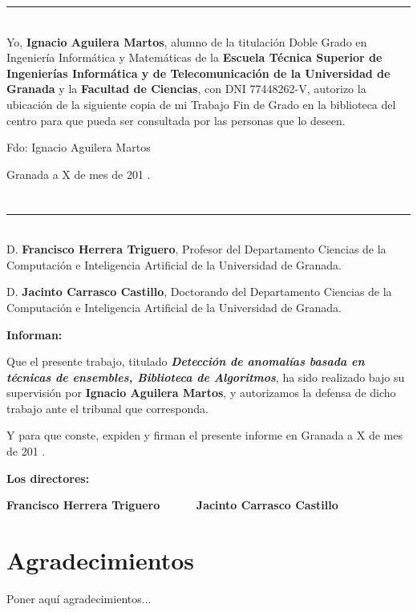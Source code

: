\noindent\rule[-1ex]{\textwidth}{2pt}\\[4.5ex]

Yo, \textbf{Ignacio Aguilera Martos}, alumno de la titulación Doble Grado en Ingeniería Informática y Matemáticas de la \textbf{Escuela Técnica Superior
de Ingenierías Informática y de Telecomunicación de la Universidad de Granada} y la \textbf{Facultad de Ciencias}, con DNI 77448262-V, autorizo la ubicación de la siguiente copia de mi Trabajo Fin de Grado en la biblioteca del centro para que pueda ser consultada por las personas que lo deseen.

\vspace{6cm}

\noindent Fdo: Ignacio Aguilera Martos

\vspace{2cm}

\begin{flushright}
Granada a X de mes de 201 .
\end{flushright}


\chapter*{}
\thispagestyle{empty}

\noindent\rule[-1ex]{\textwidth}{2pt}\\[4.5ex]

D. \textbf{Francisco Herrera Triguero}, Profesor del Departamento Ciencias de la Computación e Inteligencia Artificial de la Universidad de Granada.

\vspace{0.5cm}

D. \textbf{Jacinto Carrasco Castillo}, Doctorando del Departamento Ciencias de la Computación e Inteligencia Artificial de la Universidad de Granada.


\vspace{0.5cm}

\textbf{Informan:}

\vspace{0.5cm}

Que el presente trabajo, titulado \textit{\textbf{Detección de anomalías basada en técnicas de ensembles, Biblioteca de Algoritmos}},
ha sido realizado bajo su supervisión por \textbf{Ignacio Aguilera Martos}, y autorizamos la defensa de dicho trabajo ante el tribunal que corresponda.

\vspace{0.5cm}

Y para que conste, expiden y firman el presente informe en Granada a X de mes de 201 .

\vspace{1cm}

\textbf{Los directores:}

\vspace{5cm}

\noindent \textbf{Francisco Herrera Triguero \ \ \ \ \ Jacinto Carrasco Castillo}

\chapter*{Agradecimientos}
\thispagestyle{empty}

       \vspace{1cm}


Poner aquí agradecimientos...

